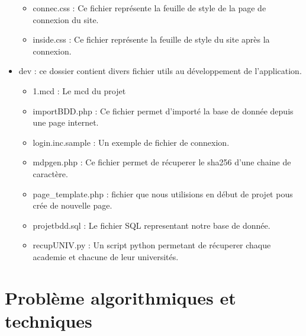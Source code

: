 \documentclass[a4paper,10pt]{report}
\begin{document}
\begin{itemize}
\begin{itemize}
        \item connec.css : Ce fichier représente la feuille de style de la page de connexion du site.
        \item inside.css : Ce fichier représente la feuille de style du site après la connexion.
    \end{itemize}
    \item dev : ce dossier contient divers fichier utils au développement de l'application.
    \begin{itemize}
        \item 1.mcd : Le mcd du projet
        \item importBDD.php : Ce fichier permet d'importé la base de donnée depuis une page internet.
        \item login.inc.sample : Un exemple de fichier de connexion.
        \item mdpgen.php : Ce fichier permet de récuperer le sha256 d'une chaine de caractère.
        \item page\_template.php : fichier que nous utilisions en début de projet pous crée de nouvelle page.
        \item projetbdd.sql : Le fichier SQL representant notre base de donnée.
        \item recupUNIV.py : Un script python permetant de récuperer chaque academie et chacune de leur universités.
    \end{itemize}



\end{itemize}


\section{Probl\`eme algorithmiques et techniques}
\end{document}
